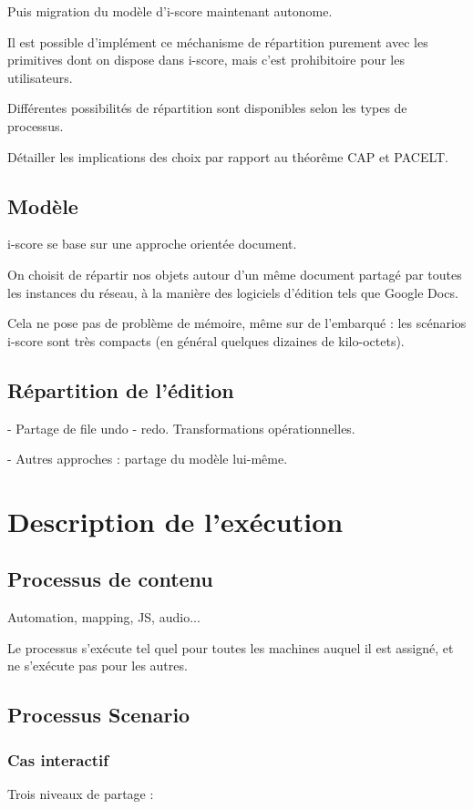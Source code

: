 \documentclass{article}
\begin{document}
Puis migration du modèle d'i-score maintenant autonome.

Il est possible d'implément ce méchanisme de répartition purement avec les primitives dont on dispose dans i-score, 
mais c'est prohibitoire pour les utilisateurs.

Différentes possibilités de répartition sont disponibles selon les types de processus.

Détailler les implications des choix par rapport au théorême CAP et PACELT.
\subsection{Modèle}
i-score se base sur une approche orientée document.

On choisit de répartir nos objets autour d'un même document partagé par toutes les instances du réseau, 
à la manière des logiciels d'édition tels que Google Docs. %

Cela ne pose pas de problème de mémoire, même sur de l'embarqué : 
les scénarios i-score sont très compacts (en général quelques dizaines de kilo-octets).

\subsection{Répartition de l'édition}
- Partage de file undo - redo. Transformations opérationnelles. %

- Autres approches : partage du modèle lui-même.

\section{Description de l'exécution}\label{sec.description}
\subsection{Processus de contenu}
Automation, mapping, JS, audio...

Le processus s'exécute tel quel pour toutes les machines auquel il est assigné, 
et ne s'exécute pas pour les autres.

\subsection{Processus Scenario}
\subsubsection{Cas interactif}
Trois niveaux de partage : 
\end{document}
